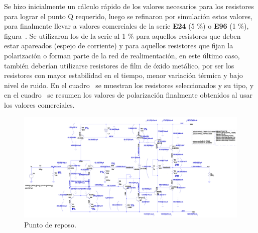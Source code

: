 
Se hizo inicialmente un cálculo rápido de los valores necesarios para los resistores para lograr el punto Q requerido, luego se refinaron por simulación estos valores, para finalmente llevar a valores comerciales de la serie \textbf{E24} (5 \%) o \textbf{E96} (1 \%), figura~. Se utilizaron los de la serie al 1 \% para aquellos resistores que deben estar apareados (espejo de corriente) y para aquellos resistores que fijan la polarización o forman parte de la red de realimentación, en este último caso, también deberían utilizarse resistores de film de óxido metálico, por ser los resistores con mayor estabilidad en el tiempo, menor variación térmica y bajo nivel de ruido. En el cuadro~ se muestran los resistores seleccionados y su tipo, y en el cuadro~ se resumen los valores de polarización finalmente obtenidos al usar los valores comerciales. \\


\vfill




\clearpage

\begin{figure}[H] %
\begin{center}
\includegraphics[width=0.93 \textheight, angle=90]{./img/circuits/amplifier_qpoint.png}
\caption{\label{fig:fig_q_point}\footnotesize{Punto de reposo.}}
\end{center}
\end{figure}

\clearpage



 
